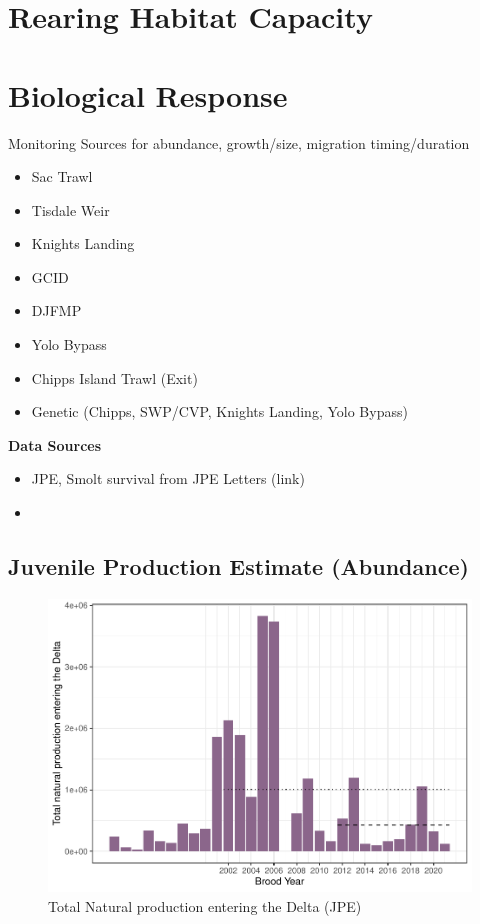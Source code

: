 \documentclass[
]{book}
\providecommand{\tightlist}{%
  \setlength{\itemsep}{0pt}\setlength{\parskip}{0pt}}
\theoremstyle{definition}
\theoremstyle{definition}
\theoremstyle{definition}
\theoremstyle{definition}
\theoremstyle{remark}
\begin{document}
\hypertarget{rearing-habitat-capacity}{%
\section{Rearing Habitat Capacity}\label{rearing-habitat-capacity}}

\hypertarget{biological-response-3}{%
\section{Biological Response}\label{biological-response-3}}

Monitoring Sources for abundance, growth/size, migration timing/duration

\begin{itemize}
\tightlist
\item
  Sac Trawl
\item
  Tisdale Weir
\item
  Knights Landing
\item
  GCID
\item
  DJFMP
\item
  Yolo Bypass
\item
  Chipps Island Trawl (Exit)
\item
  Genetic (Chipps, SWP/CVP, Knights Landing, Yolo Bypass)
\end{itemize}

\textbf{Data Sources}

\begin{itemize}
\tightlist
\item
  JPE, Smolt survival from JPE Letters (link)
\item
\end{itemize}

\hypertarget{juvenile-production-estimate-abundance}{%
\subsection{Juvenile Production Estimate (Abundance)}\label{juvenile-production-estimate-abundance}}

\begin{figure}
\centering
\includegraphics{_main_files/figure-latex/jpe-fig-1.pdf}
\caption{\label{fig:jpe-fig}Total Natural production entering the Delta (JPE)}
\end{figure}
\end{document}
